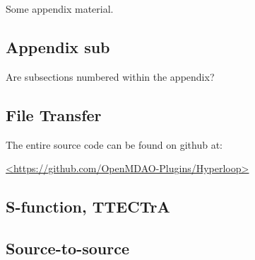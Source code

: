 \documentclass[heading.tex]{subfiles}
\begin{document}
\newpage
\appendix

Some appendix material.

\subsection{Appendix sub}
Are subsections numbered within the appendix?

\subsection{File Transfer}

The entire source code can be found on github at:

\url{<https://github.com/OpenMDAO-Plugins/Hyperloop>}

\subsection{S-function, TTECTrA}

\subsection{Source-to-source}


\end{document}
